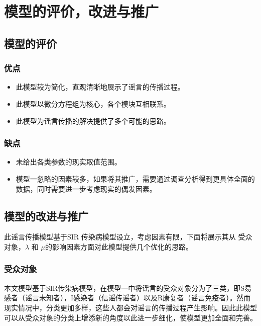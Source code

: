 \documentclass[withoutpreface,bwprint]{cumcmthesis}
\begin{document}
	\section{模型的评价，改进与推广}
\subsection{模型的评价}
\subsubsection{优点}
\begin{itemize}
	\item 此模型较为简化，直观清晰地展示了谣言的传播过程。
	\item 此模型以微分方程组为核心，各个模块互相联系。
	\item 此模型为谣言传播的解决提供了多个可能的思路。
\end{itemize}
\subsubsection{缺点}
\begin{itemize}
	\item 未给出各类参数的现实取值范围。
	\item 模型一忽略的因素较多，如果将其推广，需要通过调查分析得到更具体全面的数据，同时需要进一步考虑现实的偶发因素。
	
\end{itemize}
\subsection{模型的改进与推广}
此谣言传播模型基于SIR 传染病模型设立，考虑因素有限，下面将展示其从 受众对象，$\lambda$ 和 $\mu$的影响因素方面对此模型提供几个优化的思路。

\subsubsection{受众对象}
本文模型基于SIR传染病模型，在模型一中将谣言的受众对象分为了三类，即S易感者（谣言未知者），I感染者（信谣传谣者）以及R康复者（谣言免疫者）。然而现实情况中，分类更加多样，这些人都会对谣言的传播过程产生影响。因此此模型可以从受众对象的分类上增添新的角度以此进一步细化，使模型更加全面和完善。
\end{document}
